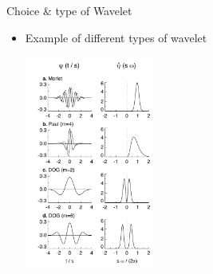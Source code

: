 \documentclass[t,10pt]{beamer}
\begin{document}
\begin{frame}{Choice \& type of Wavelet}
\begin{itemize}
\item Example of different types of wavelet \parencite{Mallat:1999te}
\begin{center}
\includegraphics[height=7cm]{various_wavelet}
\end{center}
\end{itemize}

\end{frame}
\end{document}

